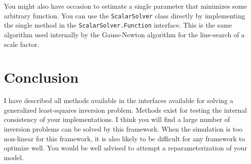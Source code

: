 \documentclass[12pt]{article}
\begin{document}
You might also have occasion to estimate a
single parameter that minimizes some
arbitrary function.  You can use the
\texttt{ScalarSolver} class directly by
implementing the single method in the
\texttt{ScalarSolver.Function} interface.
This is the same algorithm used internally by
the Gauss-Newton algorithm for the
line-search of a scale factor.

\section {Conclusion}

I have described all methods available in the
interfaces available for solving a
generalized least-squares inversion problem.
Methods exist for testing the internal
consistency of your implementations.  I think
you will find a large number of inversion
problems can be solved by this framework.
When the simulation is too non-linear for
this framework, it is also likely to be
difficult for any framework to optimize well.
You would be well advised to attempt a
reparameterization of your model.


\end{document}
